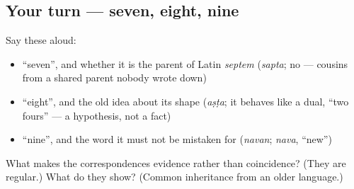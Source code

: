 \subsection*{Your turn — seven, eight, nine}
Say these aloud:

\begin{itemize}
\raggedright
  \item \textquotedblleft{}seven\textquotedblright{}, and whether it is the parent of Latin \emph{septem} (\emph{sapta}; no — cousins from a shared parent nobody wrote down)
  \item \textquotedblleft{}eight\textquotedblright{}, and the old idea about its shape (\emph{aṣṭa}; it behaves like a dual, \textquotedblleft{}two fours\textquotedblright{} — a hypothesis, not a fact)
  \item \textquotedblleft{}nine\textquotedblright{}, and the word it must not be mistaken for (\emph{navan}; \emph{nava}, \textquotedblleft{}new\textquotedblright{})
\end{itemize}

\begin{tcolorbox}[breakable,colback=teal!4,colframe=teal!35!black,title={Before you move on}]
What makes the correspondences evidence rather than coincidence? (They are regular.) What do they show? (Common inheritance from an older language.)
\end{tcolorbox}
